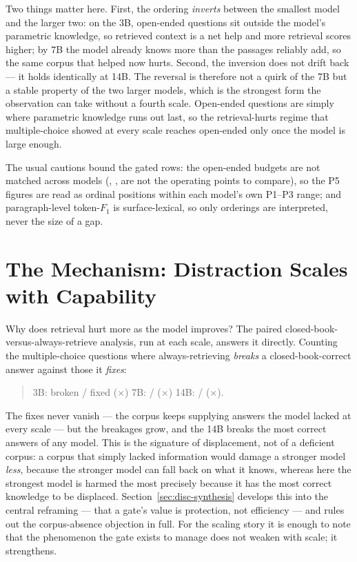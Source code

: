 Two things matter here. First, the ordering \emph{inverts} between the smallest
model and the larger two: on the 3B, open-ended questions sit outside the
model's parametric knowledge, so retrieved context is a net help and more
retrieval scores higher; by 7B the model already knows more than the passages
reliably add, so the same corpus that helped now hurts. Second, the inversion
does not drift back --- it holds identically at 14B. The reversal is therefore
not a quirk of the 7B but a stable property of the two larger models, which is
the strongest form the observation can take without a fourth scale. Open-ended
questions are simply where parametric knowledge runs out last, so the
retrieval-hurts regime that multiple-choice showed at every scale reaches
open-ended only once the model is large enough.

The usual cautions bound the gated rows: the open-ended budgets are not matched
across models (\retPfiveOpen{}, \retQwenPfiveOpen{}, \retQwenFourteenPoneOpen{}
are not the operating points to compare), so the P5 figures are read as ordinal
positions within each model's own P1--P3 range; and paragraph-level token-$F_1$
is surface-lexical, so only orderings are interpreted, never the size of a gap.

\section{The Mechanism: Distraction Scales with Capability}
\label{sec:cmp-mechanism}

Why does retrieval hurt more as the model improves? The paired
closed-book-versus-always-retrieve analysis, run at each scale, answers it
directly. Counting the multiple-choice questions where always-retrieving
\emph{breaks} a closed-book-correct answer against those it \emph{fixes}:

\begin{quote}
  3B: \breakLlama{} broken / \fixLlama{} fixed (\harmRatioLlama{}$\times$)
  \quad 7B: \breakQwenSeven{} / \fixQwenSeven{}
  (\harmRatioQwenSeven{}$\times$) \quad
  14B: \breakQwenFourteen{} / \fixQwenFourteen{}
  (\harmRatioQwenFourteen{}$\times$).
\end{quote}

The fixes never vanish --- the corpus keeps supplying answers the model lacked
at every scale --- but the breakages grow, and the 14B breaks the most correct
answers of any model. This is the signature of displacement, not of a
deficient corpus: a corpus that simply lacked information would damage a
stronger model \emph{less}, because the stronger model can fall back on what it
knows, whereas here the strongest model is harmed the most precisely because it
has the most correct knowledge to be displaced. Section~\ref{sec:disc-synthesis}
develops this into the central reframing --- that a gate's value is protection,
not efficiency --- and rules out the corpus-absence objection in full. For the scaling story it is enough to note that the phenomenon the gate
exists to manage does not weaken with scale; it strengthens.

